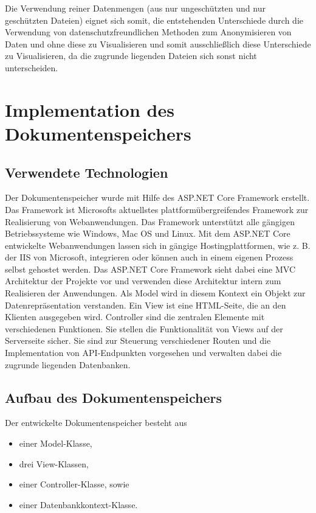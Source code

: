 \documentclass[
    fontsize=12pt,
    headings=small,
    parskip=half,           %
    bibliography=totoc,
    numbers=noenddot,       %
    open=any,               %
    ]{scrreprt}
\begin{document}
Die Verwendung reiner Datenmengen (aus nur ungeschützten und nur geschützten Dateien) eignet sich somit, die entstehenden Unterschiede durch die Verwendung von datenschutzfreundlichen Methoden zum Anonymisieren von Daten und ohne diese zu Visualisieren und somit ausschließlich diese Unterschiede zu Visualisieren, da die zugrunde liegenden Dateien sich sonst nicht unterscheiden. 

    \section{Implementation des Dokumentenspeichers}    
    
    \subsection{Verwendete Technologien}
Der Dokumentenspeicher wurde mit Hilfe des ASP.NET Core Framework erstellt. 
Das Framework ist Microsofts aktuellstes plattformübergreifendes Framework zur Realisierung von Webanwendungen.
Das Framework unterstützt alle gängigen Betriebssysteme wie Windows, Mac OS und Linux.
Mit dem ASP.NET Core entwickelte Webanwendungen lassen sich in gängige Hostingplattformen, wie z. B. der \ac{IIS} von Microsoft, integrieren oder können auch in einem eigenen Prozess selbst gehostet werden. 
Das ASP.NET Core Framework sieht dabei eine \ac{MVC} Architektur der Projekte vor und verwenden diese Architektur intern zum Realisieren der Anwendungen. 
Als Model wird in diesem Kontext ein Objekt zur Datenrepräsentation verstanden. 
Ein View ist eine HTML-Seite, die an den Klienten ausgegeben wird. Controller sind die zentralen Elemente mit verschiedenen Funktionen. 
Sie stellen die Funktionalität von Views auf der Serverseite sicher.
Sie sind zur Steuerung verschiedener Routen und die Implementation von \ac{API}-Endpunkten vorgesehen und verwalten dabei die zugrunde liegenden Datenbanken.

\newpage
    \subsection{Aufbau des Dokumentenspeichers}

Der entwickelte Dokumentenspeicher besteht aus
\begin{itemize}
\item einer Model-Klasse,
\item drei View-Klassen,
\item einer Controller-Klasse, sowie
\item einer Datenbankkontext-Klasse.
\end{itemize}
\end{document}

